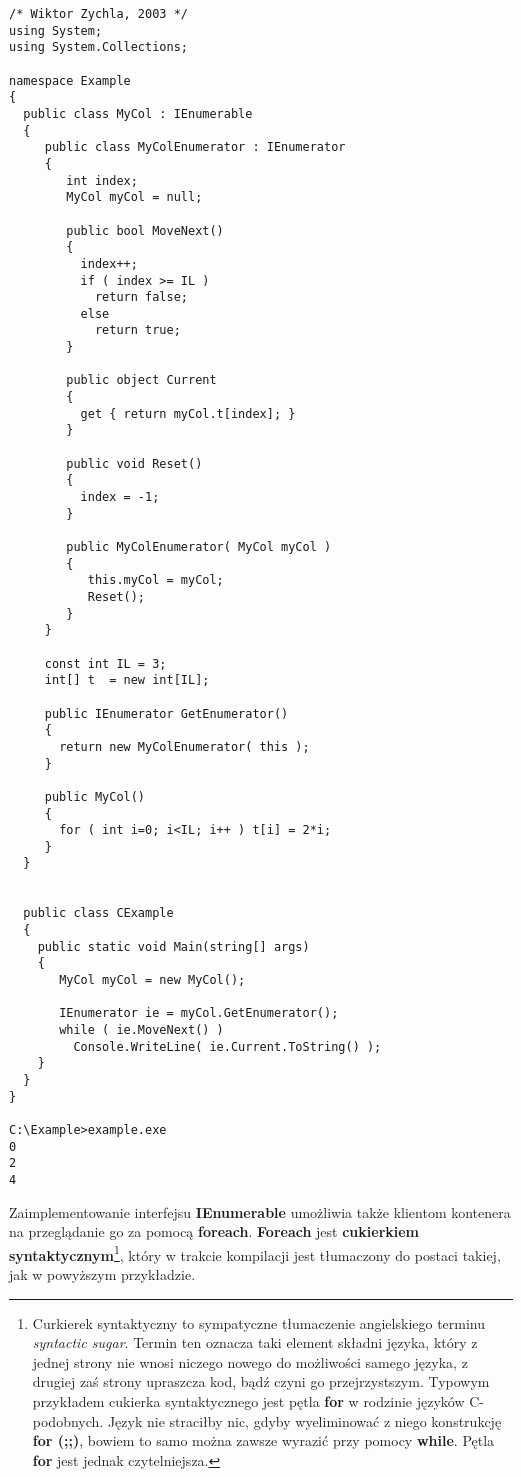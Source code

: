 \begin{scriptsize}
\begin{verbatim}
/* Wiktor Zychla, 2003 */
using System;
using System.Collections;

namespace Example
{
  public class MyCol : IEnumerable
  {
     public class MyColEnumerator : IEnumerator
     {
        int index;
        MyCol myCol = null;

        public bool MoveNext()
        {
          index++;
          if ( index >= IL ) 
            return false;
          else
            return true;
        }     

        public object Current
        {
          get { return myCol.t[index]; }
        }
 
        public void Reset()
        {
          index = -1;
        }

        public MyColEnumerator( MyCol myCol )
        {
           this.myCol = myCol;
           Reset();
        }        
     } 

     const int IL = 3;
     int[] t  = new int[IL];

     public IEnumerator GetEnumerator()
     {
       return new MyColEnumerator( this );
     }     

     public MyCol() 
     {
       for ( int i=0; i<IL; i++ ) t[i] = 2*i;
     }
  }


  public class CExample 
  {
    public static void Main(string[] args)
    {
       MyCol myCol = new MyCol();

       IEnumerator ie = myCol.GetEnumerator();
       while ( ie.MoveNext() )
         Console.WriteLine( ie.Current.ToString() );
    }
  }
}

C:\Example>example.exe
0
2
4
\end{verbatim}
\end{scriptsize}

Zaimplementowanie interfejsu {\bf IEnumerable} umożliwia także klientom kontenera na przeglądanie go
za pomocą {\bf foreach}. {\bf Foreach} jest {\bf cukierkiem syntaktycznym}\footnote{Curkierek
syntaktyczny to sympatyczne tłumaczenie angielskiego terminu {\em syntactic sugar}. Termin ten
oznacza taki element składni języka, który z jednej strony nie wnosi niczego nowego do możliwości samego języka, 
z drugiej zaś strony upraszcza kod, bądź czyni go przejrzystszym. Typowym przykładem cukierka syntaktycznego
jest pętla {\bf for} w rodzinie języków C-podobnych. Język nie straciłby nic, gdyby wyeliminować z niego
konstrukcję {\bf for (;;)}, bowiem to samo można zawsze wyrazić przy pomocy {\bf while}. Pętla {\bf for}
jest jednak czytelniejsza.}, który w trakcie kompilacji jest tłumaczony do postaci takiej, jak 
w powyższym przykładzie. 

